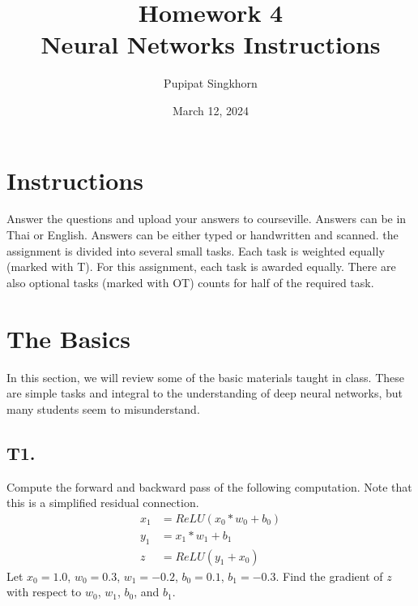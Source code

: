 \documentclass[12pt]{article}
\begin{document}
\title{Homework 4 \\
Neural Networks Instructions}
\author{Pupipat Singkhorn}
\date{March 12, 2024}
\maketitle

\section*{Instructions}
\quad Answer the questions and upload your answers to courseville. Answers can be in Thai or English. Answers can be either typed or handwritten and scanned. the assignment is divided into several small tasks. Each task is weighted equally (marked with T). For this assignment, each task is awarded equally. There are also optional tasks (marked with OT) counts for half of the required task.

\section*{The Basics}
\quad In this section, we will review some of the basic materials taught in class. These are simple tasks and integral to the understanding of deep neural networks, but many students seem to misunderstand.

\subsection*{T1.}
\quad Compute the forward and backward pass of the following computation. Note that this is a simplified residual connection.
\begin{align*}
    x_1 &= ReLU(x_0 * w_0 + b_0) \\
    y_1 &= x_1 * w_1 + b_1 \\
    z &= ReLU(y_1 + x_0)
\end{align*}
\quad Let $x_0 = 1.0$, $w_0 = 0.3$, $w_1 = -0.2$, $b_0 = 0.1$, $b_1 = -0.3$. Find the gradient of $z$ with respect to $w_0$, $w_1$, $b_0$, and $b_1$.
\end{document}
